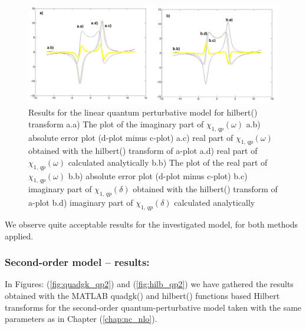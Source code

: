 \documentclass[12pt,twoside,a4paper]{article}
\numberwithin{equation}{subsection}
\numberwithin{figure}{subsection}
\begin{document}
\begin{figure}
  \includegraphics[width=150mm]{img/hilb_qp1.png}
  \caption{Results for the linear quantum perturbative model for hilbert() transform
    a.a) The plot of the imaginary part of ${\chi_{1, \, qp}}(\omega )$
    a.b) absolute error plot (d-plot minus c-plot) 
    a.c) real part of ${\chi_{1, \, qp}}(\omega )$ obtained with the hilbert()  transform of a-plot 
    a.d) real part of ${\chi_{1, \, qp}}(\omega )$ calculated analytically 
    b.b) The plot of the real part of ${\chi_{1, \, qp}}(\omega )$ 
    b.b) absolute error plot (d-plot minus c-plot) 
    b.c) imaginary part of ${\chi_{1, \, qp}}(\delta )$ obtained with the hilbert()  transform of a-plot 
    b.d) imaginary part of ${\chi_{1, \, qp}}(\delta )$ calculated analytically  
    \label{fig:hilb_qp1}
  }
\end{figure}

We observe quite acceptable results for the investigated model, for both methods applied. 

\subsubsection*{Second-order model -- results:}

In Figures: (\ref{fig:quadgk_qp2}) and (\ref{fig:hilb_qp2}) we have ga\-thered the results ob\-tained with the MATLAB quadgk() and hilbert() func\-tions based Hil\-bert transforms for the se\-cond\--order quan\-tum\--per\-tur\-bative model taken with the same para\-meters as in Chapter (\ref{chap:nc_nlo}).
\end{document}
